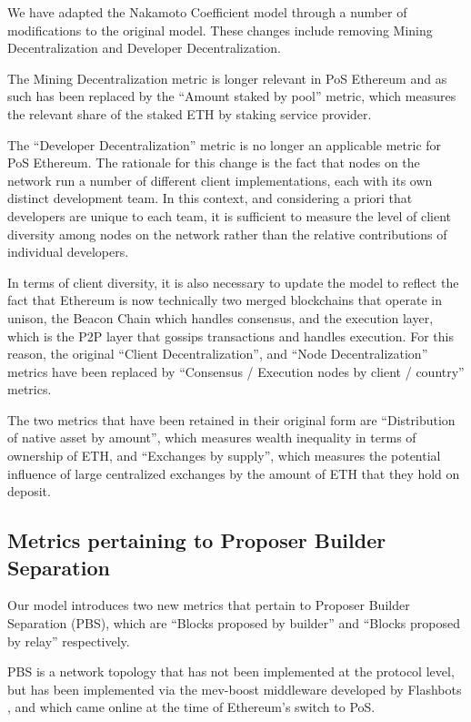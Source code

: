 \documentclass[conference]{IEEEtran}
\begin{document}
We have adapted the Nakamoto Coefficient model through a number of modifications to the original model.  These changes include removing Mining Decentralization and Developer Decentralization. 

The Mining Decentralization metric is longer relevant in PoS Ethereum and as such has been replaced by the ``Amount staked by pool'' metric, which measures the relevant share of the staked ETH by staking service provider. 

The ``Developer Decentralization'' metric is no longer an applicable metric for PoS Ethereum. The rationale for this change is the fact that nodes on the network run a number of different client implementations, each with its own distinct development team.  In this context, and considering a priori that developers are unique to each team, it is sufficient to measure the level of client diversity among nodes on the network rather than the relative contributions of individual developers. 

In terms of client diversity, it is also necessary to update the model to reflect the fact that Ethereum is now technically two merged blockchains that operate in unison, the Beacon Chain which handles consensus, and the execution layer, which is the P2P layer that gossips transactions and handles execution.  For this reason, the original ``Client Decentralization'', and ``Node Decentralization'' metrics have been replaced by ``Consensus / Execution nodes by client / country'' metrics. 

The two metrics that have been retained in their original form are ``Distribution of native asset by amount'', which measures wealth inequality in terms of ownership of ETH, and ``Exchanges by supply'', which measures the potential influence of large centralized exchanges by the amount of ETH that they hold on deposit.

\subsection{Metrics pertaining to Proposer Builder Separation}

Our model introduces two new metrics that pertain to Proposer Builder Separation (PBS), which are ``Blocks proposed by builder'' and ``Blocks proposed by relay'' respectively.

PBS is a network topology that has not been implemented at the protocol level, but has been implemented via the mev-boost middleware developed by Flashbots \cite{gosselin2021}, and which came online at the time of Ethereum's switch to PoS.
\end{document}
